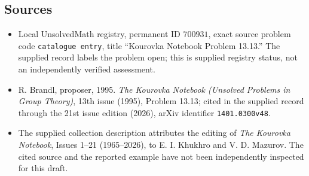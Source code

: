 \documentclass[11pt]{article}
\begin{document}
\subsection{Sources}
\begin{itemize}
\item Local UnsolvedMath registry, permanent ID \(700931\), exact source problem code \texttt{catalogue entry}, title ``Kourovka Notebook Problem 13.13.'' The supplied record labels the problem open; this is supplied registry status, not an independently verified assessment.
\item R. Brandl, proposer, 1995. \emph{The Kourovka Notebook (Unsolved Problems in Group Theory)}, 13th issue (1995), Problem 13.13; cited in the supplied record through the 21st issue edition (2026), arXiv identifier \texttt{1401.0300v48}.
\item The supplied collection description attributes the editing of \emph{The Kourovka Notebook}, Issues 1--21 (1965--2026), to E. I. Khukhro and V. D. Mazurov. The cited source and the reported example have not been independently inspected for this draft.
\end{itemize}
\end{document}
